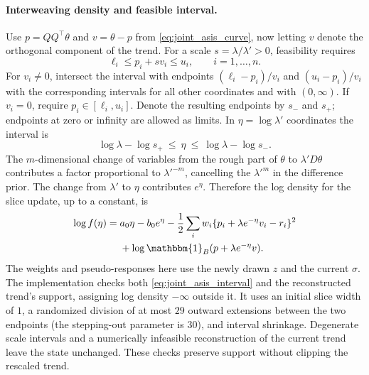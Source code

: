 \paragraph{Interweaving density and feasible interval.} Use $p=QQ^\top\theta$ and $v=\theta-p$ from \eqref{eq:joint_asis_curve}, now letting $v$ denote the orthogonal component of the trend. For a scale $s=\lambda/\lambda'>0$, feasibility requires
\[
    \ell_i\leq p_i+s v_i\leq u_i,\qquad i=1,\ldots,n.
\]
For $v_i\ne0$, intersect the interval with endpoints $(\ell_i-p_i)/v_i$ and $(u_i-p_i)/v_i$ with the corresponding intervals for all other coordinates and with $(0,\infty)$. If $v_i=0$, require $p_i\in[\ell_i,u_i]$. Denote the resulting endpoints by $s_-$ and $s_+$; endpoints at zero or infinity are allowed as limits. In $\eta=\log\lambda'$ coordinates the interval is
\begin{equation}
    \log\lambda-\log s_+\ \leq\ \eta\ \leq\ \log\lambda-\log s_-.
    \label{eq:joint_asis_interval}
\end{equation}
The $m$-dimensional change of variables from the rough part of $\theta$ to $\lambda'D\theta$ contributes a factor proportional to $\lambda'^{-m}$, cancelling the $\lambda'^m$ in the difference prior. The change from $\lambda'$ to $\eta$ contributes $e^\eta$. Therefore the log density for the slice update, up to a constant, is
\begin{equation}
\begin{aligned}
    \log f(\eta)={}&a_0\eta-b_0e^\eta
       -\frac12\sum_i w_i\{p_i+\lambda e^{-\eta}v_i-r_i\}^2\\
       &+\log\mathbbm{1}_{B}(p+\lambda e^{-\eta}v).
\end{aligned}
    \label{eq:joint_asis_density}
\end{equation}
The weights and pseudo-responses here use the newly drawn $z$ and the current $\sigma$. The implementation checks both \eqref{eq:joint_asis_interval} and the reconstructed trend's support, assigning log density $-\infty$ outside it. It uses an initial slice width of $1$, a randomized division of at most $29$ outward extensions between the two endpoints (the stepping-out parameter is $30$), and interval shrinkage. Degenerate scale intervals and a numerically infeasible reconstruction of the current trend leave the state unchanged. These checks preserve support without clipping the rescaled trend.

